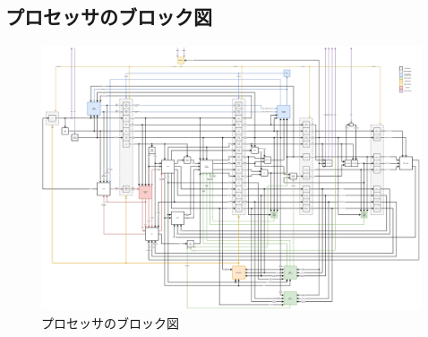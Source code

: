 \documentclass[a4paper, 10pt]{jarticle}
\begin{document}
\begin{twocolumn}
\begin{appendices}
    \section{プロセッサのブロック図} \label{section:block-diagram}
    \begin{figure}[h!]
      \centering
      \includegraphics[angle=90, origin=c, totalheight=0.9\textheight]{images/block_diagram.png}
      \caption{プロセッサのブロック図}
      \label{fig:block-diagram}
    \end{figure}
  \end{appendices}

\end{twocolumn}
\end{document}
